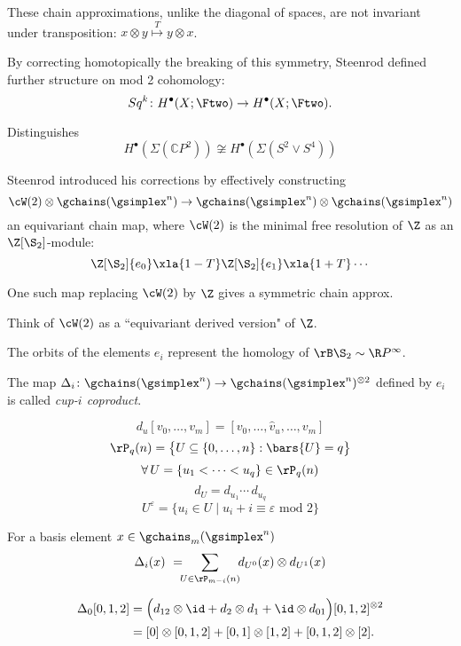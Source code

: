 These chain approximations, unlike the diagonal of spaces, are not invariant under transposition: $x \otimes y \stackrel{T}{\mapsto} y \otimes x$.

By correcting homotopically the breaking of this symmetry, Steenrod defined further structure on mod 2 cohomology:
\[
Sq^k \colon H^\bullet(X; \Ftwo) \to H^\bullet(X; \Ftwo).
\]

Distinguishes
\[
H^\bullet(\Sigma(\mathbb{C} P^2)) \not\cong H^\bullet(\Sigma(S^2 \vee S^4))
\]

Steenrod introduced his corrections by effectively constructing
\[
\cW(2) \otimes \gchains(\gsimplex^n) \to \gchains(\gsimplex^n) \otimes \gchains(\gsimplex^n)
\]
an equivariant chain map, where $\cW(2)$ is the minimal free resolution of $\Z$ as an $\Z[\S_2]$-module:
\[
\Z[\S_2]\{e_0\} \xla{1-T} \Z[\S_2]\{e_1\} \xla{1+T} \dotsb
\]

One such map replacing $\cW(2)$ by $\Z$ gives a symmetric chain approx.

Think of $\cW(2)$ as a ``equivariant derived version" of $\Z$.

The orbits of the elements $e_i$ represent the homology of $\rB \S_2 \sim \R P^\infty$.

The map $\Delta_i \colon \gchains(\gsimplex^n) \to \gchains(\gsimplex^n)^{\otimes 2}$ defined by $e_i$ is called \textit{cup-$i$ coproduct}.


\[
d_u[v_0, \dots, v_m] = [v_0, \dots, \widehat v_u, \dots, v_m]
\]
\[
\rP_q(n) = \big\{ U \subseteq \{0,\dots,n\} : \bars{U} = q \big\}
\]
\[
\forall \, U = \{u_1 < \dots < u_q\} \in \rP_q(n)
\]
\[
d_U = d_{u_1} \dotsm \, d_{u_q}
\]
\[
U^\varepsilon = \big\{ u_i \in U \mid u_i + i \equiv \varepsilon \text{ mod } 2 \big\}
\]
\begin{definition}[Med.]
	For a basis element $x \in \gchains_m(\gsimplex^n)$
	\vspace*{-5pt}
	\[
	\Delta_i(x) \ = \!\!\! \sum_{U \in \rP_{m-i}(n)} \!\! d_{U^0}(x) \otimes d_{U^1}(x)
	\]
	\vspace*{-10pt}
\end{definition}

\begin{align*}
\Delta_0 [0,1,2] &=
\Big( d_{12} \otimes \id + d_2 \otimes d_1 + \id \otimes d_{01} \Big) [0,1,2]^{\otimes 2} \\ &=
[0] \otimes [0,1,2] + [0,1] \otimes [1,2] + [0,1,2] \otimes [2].
\end{align*}










